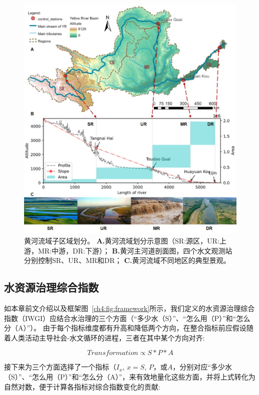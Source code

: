 \begin{figure}[hbtp!]
\centering
\includegraphics[width=\textwidth]{img/ch4/s1_study_area.jpg}
\caption[黄河流域子区域划分]{黄河流域子区域划分。
    \textbf{A.}黄河流域划分示意图（SR:源区，UR:上游，MR:中游，DR:下游）；
    \textbf{B.}黄河主河道剖面图，四个水文观测站分别控制SR、UR、MR和DR；
    \textbf{C.}黄河流域不同地区的典型景观。}\label{fig:YRB}
\end{figure}

\subsection{水资源治理综合指数}

如本章前文介绍以及框架图~\ref{ch4:fig:framework}所示，我们定义的水资源治理综合指数（IWGI）应结合水治理的三个方面（“多少水（S）”、“怎么用（P）”和“怎么分（A）”）。
由于每个指标维度都有升高和降低两个方向，在整合指标前应假设随着人类活动主导社会-水文循环的进程，三者在其中某个方向对齐:

\begin{equation}
    Transformation \propto S*P*A
\end{equation}

接下来为三个方面选择了一个指标（$I_x$, $x=S$, $P$，或$A$，分别对应“多少水（S）”、“怎么用（P）”和“怎么分（A）”，来有效地量化这些方面，并将上式转化为自然对数，便于计算各指标对综合指数变化的贡献:

